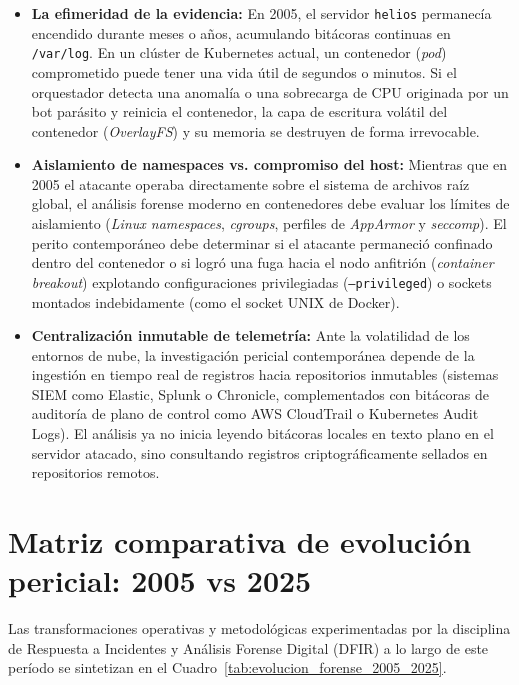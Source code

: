 \begin{itemize}
    \item \textbf{La efimeridad de la evidencia:} En 2005, el servidor \texttt{helios} permanecía encendido durante meses o años, acumulando bitácoras continuas en \texttt{/var/log}. En un clúster de Kubernetes actual, un contenedor (\textit{pod}) comprometido puede tener una vida útil de segundos o minutos. Si el orquestador detecta una anomalía o una sobrecarga de CPU originada por un bot parásito y reinicia el contenedor, la capa de escritura volátil del contenedor (\textit{OverlayFS}) y su memoria se destruyen de forma irrevocable.
    \item \textbf{Aislamiento de namespaces vs. compromiso del host:} Mientras que en 2005 el atacante operaba directamente sobre el sistema de archivos raíz global, el análisis forense moderno en contenedores debe evaluar los límites de aislamiento (\textit{Linux namespaces}, \textit{cgroups}, perfiles de \textit{AppArmor} y \textit{seccomp}). El perito contemporáneo debe determinar si el atacante permaneció confinado dentro del contenedor o si logró una fuga hacia el nodo anfitrión (\textit{container breakout}) explotando configuraciones privilegiadas (\texttt{--privileged}) o sockets montados indebidamente (como el socket UNIX de Docker).
    \item \textbf{Centralización inmutable de telemetría:} Ante la volatilidad de los entornos de nube, la investigación pericial contemporánea depende de la ingestión en tiempo real de registros hacia repositorios inmutables (sistemas SIEM como Elastic, Splunk o Chronicle, complementados con bitácoras de auditoría de plano de control como AWS CloudTrail o Kubernetes Audit Logs). El análisis ya no inicia leyendo bitácoras locales en texto plano en el servidor atacado, sino consultando registros criptográficamente sellados en repositorios remotos.
\end{itemize}

\section{Matriz comparativa de evolución pericial: 2005 vs 2025}

Las transformaciones operativas y metodológicas experimentadas por la disciplina de Respuesta a Incidentes y Análisis Forense Digital (DFIR) a lo largo de este período se sintetizan en el Cuadro~\ref{tab:evolucion_forense_2005_2025}.

